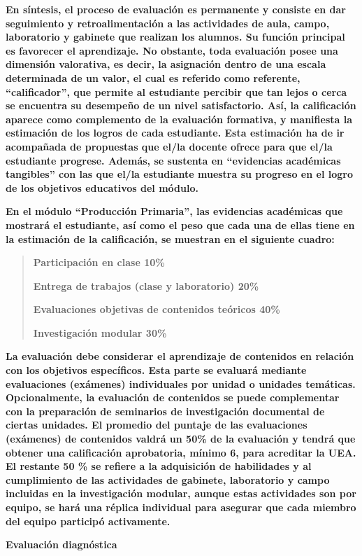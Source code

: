 \documentclass[
]{article}
\begin{document}
\textbf{En síntesis, el proceso de evaluación es permanente y consiste
en dar seguimiento y retroalimentación a las actividades de aula, campo,
laboratorio y gabinete que realizan los alumnos. Su función principal es
favorecer el aprendizaje. No obstante, toda evaluación posee una
dimensión valorativa, es decir, la asignación dentro de una escala
determinada de un valor, el cual es referido como referente,
``calificador'', que permite al estudiante percibir que tan lejos o
cerca se encuentra su desempeño de un nivel satisfactorio. Así, la
calificación aparece como complemento de la evaluación formativa, y
manifiesta la estimación de los logros de cada estudiante. Esta
estimación ha de ir acompañada de propuestas que el/la docente ofrece
para que el/la estudiante progrese. Además, se sustenta en ``evidencias
académicas tangibles'' con las que el/la estudiante muestra su progreso
en el logro de los objetivos educativos del módulo.}

\textbf{En el módulo ``Producción Primaria'', las evidencias académicas
que mostrará el estudiante, así como el peso que cada una de ellas tiene
en la estimación de la calificación, se muestran en el siguiente
cuadro:}

\begin{quote}
\textbf{Participación en clase 10\%}

\textbf{Entrega de trabajos (clase y laboratorio) 20\%}

\textbf{Evaluaciones objetivas de contenidos teóricos 40\%}

\textbf{Investigación modular 30\%}
\end{quote}

\textbf{La evaluación debe considerar el aprendizaje de contenidos en
relación con los objetivos específicos. Esta parte se evaluará mediante
evaluaciones (exámenes) individuales por unidad o unidades temáticas.
Opcionalmente, la evaluación de contenidos se puede complementar con la
preparación de seminarios de investigación documental de ciertas
unidades. El promedio del puntaje de las evaluaciones (exámenes) de
contenidos valdrá un 50\% de la evaluación y tendrá que obtener una
calificación aprobatoria, mínimo 6, para acreditar la UEA. El restante
50 \% se refiere a la adquisición de habilidades y al cumplimiento de
las actividades de gabinete, laboratorio y campo incluidas en la
investigación modular, aunque estas actividades son por equipo, se hará
una réplica individual para asegurar que cada miembro del equipo
participó activamente.}

\textbf{Evaluación diagnóstica}
\end{document}
